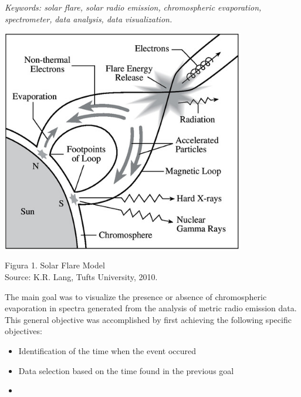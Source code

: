 \documentclass[a0paper,portrait]{baposter}
\begin{document}
\begin{poster}
{\textit{Keywords: solar flare, solar radio emission,}\newline
\textit{chromospheric evaporation, spectrometer,}\newline
\textit{data analysis, data visualization.}
}


{\begin{center}
        \includegraphics[width=0.8\textwidth]{figures/solar-flare-model.jpg}

        Figura 1. Solar Flare Model\\
        Source: K.R. Lang, Tufts University, 2010.
    \end{center}
}




{The main goal was to visualize the presence or absence of chromospheric evaporation in spectra
    generated from the analysis of metric radio emission data. This general objective was accomplished
    by first achieving the following specific objectives:
    \begin{itemize}
        \item Identification of the time when the event occured
        \item Data selection based on the time found in the previous goal
        \item 
    \end{itemize}

}
\end{poster}
\end{document}
